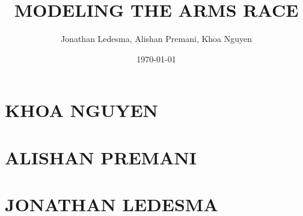 

\title{MODELING THE ARMS RACE}		%


\author{Jonathan Ledesma, Alishan Premani, Khoa Nguyen}					%


\date{\today}				%


\maketitle		%
			

\section{KHOA NGUYEN}

\section{ALISHAN PREMANI}

\section{JONATHAN LEDESMA}		



